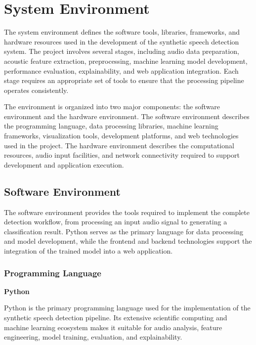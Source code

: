 \documentclass[12pt,a4paper]{report}
\begin{document}


\section{System Environment}

The system environment defines the software tools, libraries, frameworks, and hardware resources used in the development of the synthetic speech detection system. The project involves several stages, including audio data preparation, acoustic feature extraction, preprocessing, machine learning model development, performance evaluation, explainability, and web application integration. Each stage requires an appropriate set of tools to ensure that the processing pipeline operates consistently.

The environment is organized into two major components: the software environment and the hardware environment. The software environment describes the programming language, data processing libraries, machine learning frameworks, visualization tools, development platforms, and web technologies used in the project. The hardware environment describes the computational resources, audio input facilities, and network connectivity required to support development and application execution.


\subsection{Software Environment}

The software environment provides the tools required to implement the complete detection workflow, from processing an input audio signal to generating a classification result. Python serves as the primary language for data processing and model development, while the frontend and backend technologies support the integration of the trained model into a web application.

\subsubsection{Programming Language}

\textbf{Python}

Python is the primary programming language used for the implementation of the synthetic speech detection pipeline. Its extensive scientific computing and machine learning ecosystem makes it suitable for audio analysis, feature engineering, model training, evaluation, and explainability.
\end{document}
